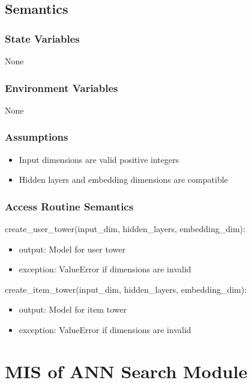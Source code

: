 \documentclass[12pt, titlepage]{article}
\begin{document}
\subsection{Semantics}

\subsubsection{State Variables}
None

\subsubsection{Environment Variables}

None

\subsubsection{Assumptions}

\begin{itemize}
  \item Input dimensions are valid positive integers
  \item Hidden layers and embedding dimensions are compatible
\end{itemize}

\subsubsection{Access Routine Semantics}

\noindent create\_user\_tower(input\_dim, hidden\_layers, embedding\_dim):
\begin{itemize}
\item output: Model for user tower
\item exception: ValueError if dimensions are invalid
\end{itemize}

\noindent create\_item\_tower(input\_dim, hidden\_layers, embedding\_dim):
\begin{itemize}
\item output: Model for item tower
\item exception: ValueError if dimensions are invalid
\end{itemize}

\newpage

\section{MIS of ANN Search Module} \label{ModuleANN}
\end{document}

